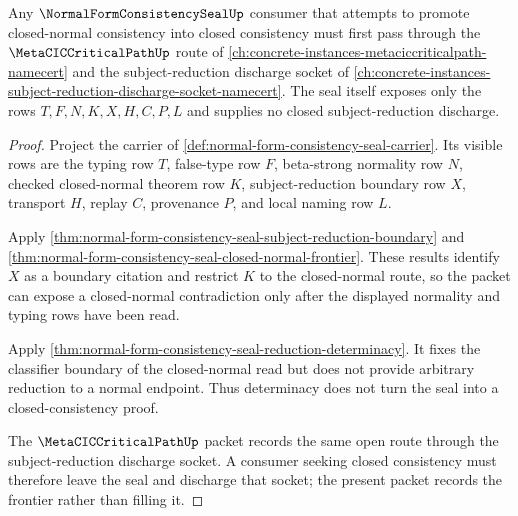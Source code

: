 \begin{theorem}
\label{thm:normal-form-consistency-seal-metacic-discharge-frontier}
Any $\NormalFormConsistencySealUp$ consumer that attempts to promote
closed-normal consistency into closed consistency must first pass through the
$\MetaCICCriticalPathUp$ route of
\autoref{ch:concrete-instances-metaciccriticalpath-namecert} and the
subject-reduction discharge socket of
\autoref{ch:concrete-instances-subject-reduction-discharge-socket-namecert}.
The seal itself exposes only the rows $T,F,N,K,X,H,C,P,L$ and supplies no
closed subject-reduction discharge.
\end{theorem}
\begin{proof}
Project the carrier of
\autoref{def:normal-form-consistency-seal-carrier}. Its visible rows are the
typing row $T$, false-type row $F$, beta-strong normality row $N$, checked
closed-normal theorem row $K$, subject-reduction boundary row $X$, transport
$H$, replay $C$, provenance $P$, and local naming row $L$.

Apply
\autoref{thm:normal-form-consistency-seal-subject-reduction-boundary} and
\autoref{thm:normal-form-consistency-seal-closed-normal-frontier}. These
results identify $X$ as a boundary citation and restrict $K$ to the
closed-normal route, so the packet can expose a closed-normal contradiction
only after the displayed normality and typing rows have been read.

Apply
\autoref{thm:normal-form-consistency-seal-reduction-determinacy}. It fixes the
classifier boundary of the closed-normal read but does not provide arbitrary
reduction to a normal endpoint. Thus determinacy does not turn the seal into a
closed-consistency proof.

The $\MetaCICCriticalPathUp$ packet records the same open route through the
subject-reduction discharge socket. A consumer seeking closed consistency must
therefore leave the seal and discharge that socket; the present packet records
the frontier rather than filling it.
\end{proof}

